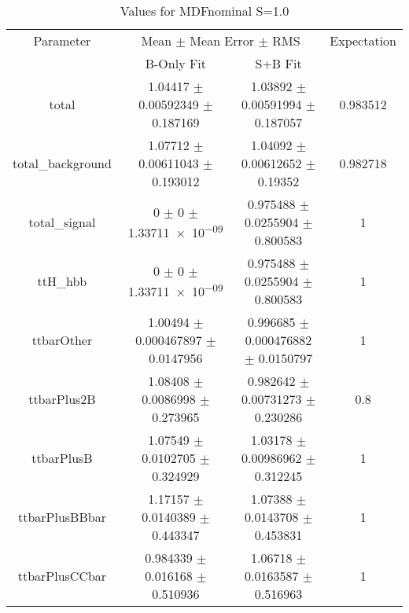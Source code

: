 \begin{table}
\centering
\caption{Values for MDFnominal S=1.0}
\begin{tabular}{cccc}
\toprule
Parameter & \multicolumn{2}{c}{Mean $\pm$ Mean Error $\pm$ RMS} & Expectation\\
 & B-Only Fit & S+B Fit & \\
\midrule
total & \num{1.04417} $\pm$ \num{0.00592349} $\pm$ \num{0.187169} & \num{1.03892} $\pm$ \num{0.00591994} $\pm$ \num{0.187057} & \num{0.983512}\\
total\_background & \num{1.07712} $\pm$ \num{0.00611043} $\pm$ \num{0.193012} & \num{1.04092} $\pm$ \num{0.00612652} $\pm$ \num{0.19352} & \num{0.982718}\\
total\_signal & \num{0} $\pm$ \num{0} $\pm$ \num{1.33711e-09} & \num{0.975488} $\pm$ \num{0.0255904} $\pm$ \num{0.800583} & \num{1}\\
ttH\_hbb & \num{0} $\pm$ \num{0} $\pm$ \num{1.33711e-09} & \num{0.975488} $\pm$ \num{0.0255904} $\pm$ \num{0.800583} & \num{1}\\
ttbarOther & \num{1.00494} $\pm$ \num{0.000467897} $\pm$ \num{0.0147956} & \num{0.996685} $\pm$ \num{0.000476882} $\pm$ \num{0.0150797} & \num{1}\\
ttbarPlus2B & \num{1.08408} $\pm$ \num{0.0086998} $\pm$ \num{0.273965} & \num{0.982642} $\pm$ \num{0.00731273} $\pm$ \num{0.230286} & \num{0.8}\\
ttbarPlusB & \num{1.07549} $\pm$ \num{0.0102705} $\pm$ \num{0.324929} & \num{1.03178} $\pm$ \num{0.00986962} $\pm$ \num{0.312245} & \num{1}\\
ttbarPlusBBbar & \num{1.17157} $\pm$ \num{0.0140389} $\pm$ \num{0.443347} & \num{1.07388} $\pm$ \num{0.0143708} $\pm$ \num{0.453831} & \num{1}\\
ttbarPlusCCbar & \num{0.984339} $\pm$ \num{0.016168} $\pm$ \num{0.510936} & \num{1.06718} $\pm$ \num{0.0163587} $\pm$ \num{0.516963} & \num{1}\\
\bottomrule
\end{tabular}
\end{table}